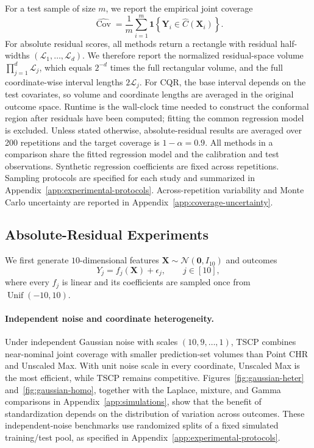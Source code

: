For a test sample of size $m$, we report the empirical joint coverage
\[
  \widehat{\operatorname{Cov}}
  = \frac{1}{m}\sum_{i=1}^{m}
    \mathbf{1}\!\left\{\boldsymbol{Y}_i
    \in \widehat{C}(\boldsymbol{X}_i)\right\}.
\]
For absolute residual scores, all methods return a rectangle with residual
half-widths $(\mathcal{L}_1,\ldots,\mathcal{L}_d)$. We therefore report the normalized
residual-space volume $\prod_{j=1}^{d}\mathcal{L}_j$, which equals $2^{-d}$ times the
full rectangular volume, and the full coordinate-wise interval lengths
$2\mathcal{L}_j$. For CQR, the base interval depends on the test covariates, so volume
and coordinate lengths are averaged in the original outcome space. Runtime is
the wall-clock time needed to construct the conformal region after residuals
have been computed; fitting the common regression model is excluded. Unless
stated otherwise, absolute-residual results are averaged over 200 repetitions
and the target coverage is $1-\alpha=0.9$. All methods in a comparison share
the fitted regression model and the calibration and test observations.
Synthetic regression coefficients are fixed across repetitions. Sampling
protocols are specified for each study and summarized in
Appendix~\ref{app:experimental-protocols}. Across-repetition variability and
Monte Carlo uncertainty are reported in Appendix~\ref{app:coverage-uncertainty}.

\subsection{Absolute-Residual Experiments}
\label{sec:absolute-residual-experiments}

We first generate $10$-dimensional features
$\boldsymbol{X}\sim\mathcal{N}(\boldsymbol{0},I_{10})$ and outcomes
\[
  Y_j = f_j(\boldsymbol{X}) + \epsilon_j,
  \qquad j\in[10],
\]
where every $f_j$ is linear and its coefficients are sampled once
from $\operatorname{Unif}(-10,10)$.

\paragraph{Independent noise and coordinate heterogeneity.}
Under independent Gaussian noise with scales $(10,9,\ldots,1)$, TSCP
combines near-nominal joint coverage with smaller prediction-set volumes
than Point CHR and Unscaled Max. With unit noise scale in every coordinate,
Unscaled Max is the most efficient, while TSCP remains competitive.
Figures~\ref{fig:gaussian-heter} and~\ref{fig:gaussian-homo}, together with
the Laplace, mixture, and Gamma comparisons in
Appendix~\ref{app:simulations}, show that the benefit of standardization
depends on the distribution of variation across outcomes. These
independent-noise benchmarks use randomized splits of a fixed simulated
training/test pool, as specified in Appendix~\ref{app:experimental-protocols}.

